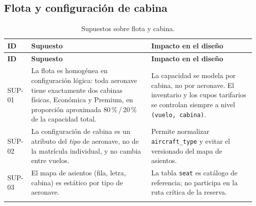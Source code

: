 \documentclass[10pt,letterpaper]{article}
\begin{document}
\subsection{Flota y configuración de cabina}
\begin{longtable}{@{}L{1.7cm} L{7.4cm} L{6.1cm}@{}}
\toprule
\textbf{ID} & \textbf{Supuesto} & \textbf{Impacto en el diseño} \\
\midrule
\endfirsthead
\toprule
\textbf{ID} & \textbf{Supuesto} & \textbf{Impacto en el diseño} \\
\midrule
\endhead
SUP-01 & La flota es homogénea en configuración lógica: toda aeronave tiene exactamente dos cabinas físicas, Económica y Premium, en proporción aproximada 80\,\%\,/\,20\,\% de la capacidad total. & La capacidad se modela por cabina, no por aeronave. El inventario y los cupos tarifarios se controlan siempre a nivel \texttt{(vuelo, cabina)}. \\
SUP-02 & La configuración de cabina es un atributo del \emph{tipo} de aeronave, no de la matrícula individual, y no cambia entre vuelos. & Permite normalizar \texttt{aircraft\_type} y evitar el versionado del mapa de asientos. \\
SUP-03 & El mapa de asientos (fila, letra, cabina) es estático por tipo de aeronave. & La tabla \texttt{seat} es catálogo de referencia; no participa en la ruta crítica de la reserva. \\
\bottomrule
\caption{Supuestos sobre flota y cabina.}
\end{longtable}
\end{document}
